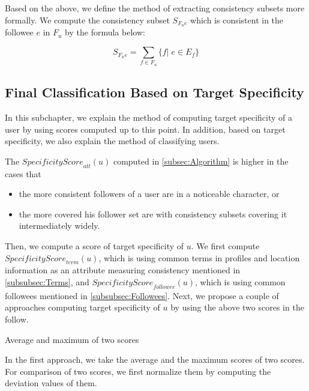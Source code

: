 Based on the above, we define the method of extracting consistency
subsets more formally.  We compute the consistency subset $S_{F_ue}$
which is consistent in the followee $e$ in $F_u$ by the formula below:

\vspace{-1ex}
\[
 S_{F_ue} =  \sum_{f \in F_u} \{f|\;e \in E_f \}
\]
\vspace{-2ex}


\subsection{Final Classification Based on Target Specificity}
\label{subsec:Final Classification}

In this subchapter, we explain the method of computing target
specificity of a user by using scores computed up to this
point.  In addition, based on target specificity, we also explain the
method of classifying users.

The $\mathit{SpecificityScore}_{{\mathit{att}}}(u)$ computed in
\ref{subsec:Algorithm} is higher in the cases that

\begin{itemize}
\item the more consistent followers of a user are in a noticeable
      character, or
\item the more covered his follower set are with consistency
      subsets covering it intermediately widely.
\end{itemize}

Then, we compute a score of target specificity of $u$. We first
compute $\mathit{SpecificityScore}_{{\mathit{term}}}(u)$, which is using
common terms in profiles and location information as an attribute
measuring consistency mentioned in \ref{subsubsec:Terms}, and
$\mathit{SpecificityScore}_{{\mathit{followee}}}(u)$, which is using
common followees mentioned in \ref{subsubsec:Followees}.  Next, we propose
a couple of approaches computing target specificity of $u$ by using the
above two scores in the follow.

\begin{description}
\bf{\item[(1)] Average and maximum of two scores}
\label{item:Avg and Max}
\end{description}

In the first approach, we take the average and the maximum scores of two
scores.  For comparison of two scores, we first normalize them by
computing the deviation values of them.

